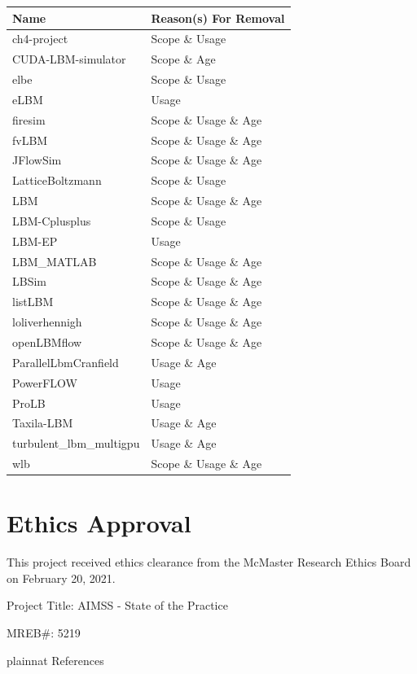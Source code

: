 \documentclass[12pt, notitlepage]{article}
\begin{document}
\begin{appendices}
\begin{singlespace}
\begin{center}
	\begin{tabular}{ p{4cm}p{4cm}}
		\hline
		Name & Reason(s) For Removal\\
		\hline
		ch4-project&Scope \& Usage\\
		CUDA-LBM-simulator&Scope \& Age\\
		elbe&Scope \& Usage\\
		eLBM&Usage\\
		firesim&Scope \& Usage \& Age\\
		fvLBM&Scope \& Usage \& Age\\
		JFlowSim&Scope \& Usage \& Age\\
		LatticeBoltzmann&Scope \& Usage\\
		LBM&Scope \& Usage \& Age\\
		LBM-Cplusplus&Scope \& Usage\\
		LBM-EP&Usage\\
		LBM\_MATLAB&Scope \& Usage \& Age\\
		LBSim&Scope \& Usage \& Age\\
		listLBM&Scope \& Usage \& Age\\
		loliverhennigh&Scope \& Usage \& Age\\
		openLBMflow&Scope \& Usage \& Age\\
		ParallelLbmCranfield&Usage \& Age\\
		PowerFLOW&Usage\\
		ProLB&Usage\\
		Taxila-LBM&Usage \& Age\\
		turbulent\_lbm\_multigpu&Usage \& Age\\
		wlb&Scope \& Usage \& Age\\
		\hline
	\end{tabular}
	\label{eliminatedpackages}
\end{center}

\newpage

\section{Ethics Approval}\label{ethicsapproval}
This project received ethics clearance from the McMaster Research Ethics Board on February 20, 2021.\newline


Project Title: AIMSS - State of the Practice\newline


MREB\#: 5219

\end{singlespace}
\end{appendices}
\newpage
\begin{singlespace}
 {plainnat}
 {References}

\end{singlespace}
\end{document}
